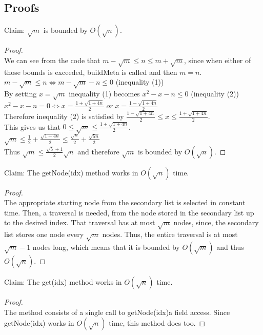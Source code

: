 \documentclass[10pt]{article}
\begin{document}
\subsection{Proofs}
Claim: $\sqrt{m}$ is bounded by $O(\sqrt{n})$.
\begin{proof}
	$ $\\
	We can see from the code that $m - \sqrt{m} \leq n \leq m + \sqrt{m}$, since when either of those bounds is exceeded, buildMeta is called and then $m = n$.\\
	$m - \sqrt{m} \leq n \iff m - \sqrt{m} - n \leq 0$ (inequality (1))\\
	By setting $x = \sqrt{m}$ inequality (1) becomes $x^2 - x - n \leq 0$ (inequality (2))\\
	$x^2 - x - n = 0 \iff x = \frac{1 + \sqrt{1 + 4n}}{2} \; or \; x = \frac{1 - \sqrt{1 + 4n}}{2}$\\
	Therefore inequality (2) is satisfied by $\frac{1 - \sqrt{1 + 4n}}{2} \leq x \leq \frac{1 + \sqrt{1 + 4n}}{2}$.\\
	This gives us that $0 \leq \sqrt{m} \leq \frac{1 + \sqrt{1 + 4n}}{2}$.\\
	$\sqrt{m} \leq \frac{1}{2} + \frac{\sqrt{1 + 4n}}{2} \leq \frac{\sqrt{n}}{2} + \frac{\sqrt{5n}}{2}$\\
	Thus $\sqrt{m} \leq \frac{\sqrt{5} + 1}{2}\sqrt{n}$ and therefore $\sqrt{m}$ is bounded by $O(\sqrt{n})$.

\end{proof}

Claim: The getNode(idx) method works in $O(\sqrt{n})$ time.
\begin{proof}
	$ $\\
	The appropriate starting node from the secondary list is selected in constant time. Then, a traversal is needed, from the node stored in the secondary list up to the desired index. That traversal has at most $\sqrt{m}$ nodes, since, the secondary list stores one node every $\sqrt{m}$ nodes. Thus, the entire traversal is at most $\sqrt{m} - 1$ nodes long, which means that it is bounded by $O(\sqrt{m})$ and thus $O(\sqrt{n})$.
\end{proof}

Claim: The get(idx) method works in $O(\sqrt{n})$ time.
\begin{proof}
	$ $\\
	The method consists of a single call to getNode(idx)a field access. Since getNode(idx) works in $O(\sqrt{n})$ time, this method does too.
\end{proof}
\end{document}
